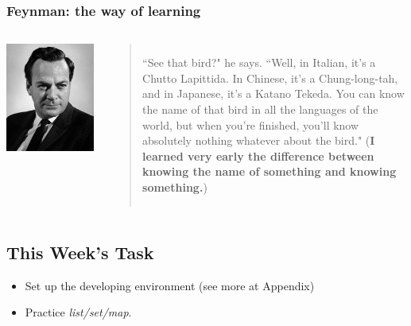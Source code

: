 \documentclass[aspectratio=169, 14pt]{beamer}
\begin{document}
\begin{frame}
    \frametitle{Feynman: the way of learning}
    \begin{columns}
        \includegraphics[height=0.5\paperheight]{week0/feynman}
        \begin{quote}
        ``See that bird?" he says. ``Well, in Italian, it's a Chutto Lapittida. In Chinese, it's a Chung-long-tah, and in Japanese, it's a Katano Tekeda. You can know the name of that bird in all the languages of the world, but when you're finished, you'll know absolutely nothing whatever about the bird." 
            (\textbf{I learned very early the difference between knowing the name of something and knowing something.})               
        \end{quote} 
    \end{columns}

\end{frame}


\begin{frame}
    \section{\textcolor{darkmidnightblue}{This Week's Task}}
\begin{itemize}
    \item Set up the developing environment (see more at Appendix)
    \item Practice \emph{list/set/map}.
\end{itemize}
\end{frame}
\end{document}
